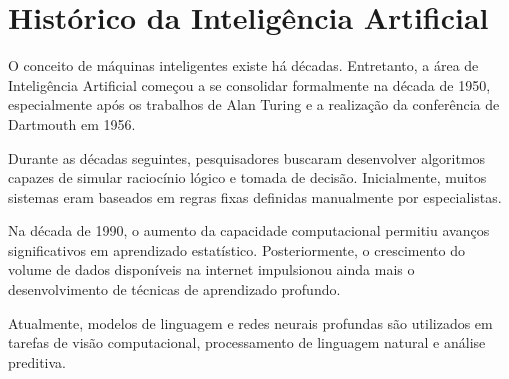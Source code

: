 \section{Histórico da Inteligência Artificial}

O conceito de máquinas inteligentes existe há décadas. Entretanto, a área de Inteligência
Artificial começou a se consolidar formalmente na década de 1950, especialmente após os
trabalhos de Alan Turing e a realização da conferência de Dartmouth em 1956.

Durante as décadas seguintes, pesquisadores buscaram desenvolver algoritmos capazes de
simular raciocínio lógico e tomada de decisão. Inicialmente, muitos sistemas eram baseados em
regras fixas definidas manualmente por especialistas.

Na década de 1990, o aumento da capacidade computacional permitiu avanços significativos em
aprendizado estatístico. Posteriormente, o crescimento do volume de dados disponíveis na
internet impulsionou ainda mais o desenvolvimento de técnicas de aprendizado profundo.

Atualmente, modelos de linguagem e redes neurais profundas são utilizados em tarefas de visão
computacional, processamento de linguagem natural e análise preditiva.
 
